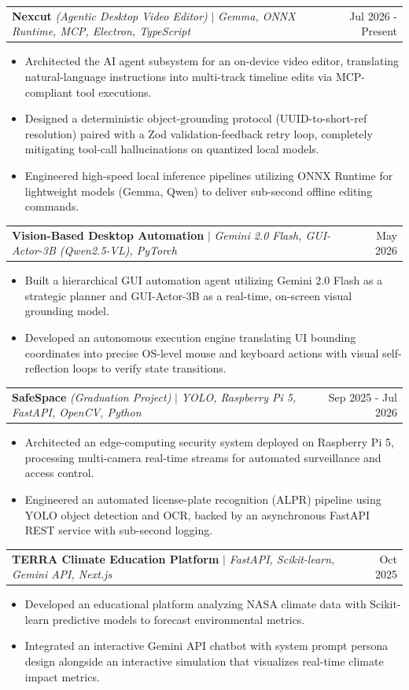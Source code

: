 \documentclass[letterpaper,11pt]{article}
\makeatletter
\newcommand{\resumeItem}[1]{
  \item\small{
    {#1 \vspace{-2.5pt}}
  }
}
\newcommand{\resumeProjectHeading}[2]{
    \item
    \begin{tabular*}{0.97\textwidth}{l@{\extracolsep{\fill}}r}
      \small#1 & #2 \\
    \end{tabular*}\vspace{-7pt}
}
\newcommand{\resumeItemListStart}{\begin{itemize}}
\newcommand{\resumeItemListEnd}{\end{itemize}\vspace{-5pt}}
\makeatother
\begin{document}
      \resumeProjectHeading
          {\textbf{Nexcut} \emph{(Agentic Desktop Video Editor)} $|$ \emph{Gemma, ONNX Runtime, MCP, Electron, TypeScript}}{Jul 2026 - Present}
          \resumeItemListStart
            \resumeItem{Architected the AI agent subsystem for an on-device video editor, translating natural-language instructions into multi-track timeline edits via MCP-compliant tool executions.}
            \resumeItem{Designed a deterministic object-grounding protocol (UUID-to-short-ref resolution) paired with a Zod validation-feedback retry loop, completely mitigating tool-call hallucinations on quantized local models.}
            \resumeItem{Engineered high-speed local inference pipelines utilizing ONNX Runtime for lightweight models (Gemma, Qwen) to deliver sub-second offline editing commands.}
          \resumeItemListEnd

      \resumeProjectHeading
          {\textbf{Vision-Based Desktop Automation} $|$ \emph{Gemini 2.0 Flash, GUI-Actor-3B (Qwen2.5-VL), PyTorch}}{May 2026}
          \resumeItemListStart
            \resumeItem{Built a hierarchical GUI automation agent utilizing Gemini 2.0 Flash as a strategic planner and GUI-Actor-3B as a real-time, on-screen visual grounding model.}
            \resumeItem{Developed an autonomous execution engine translating UI bounding coordinates into precise OS-level mouse and keyboard actions with visual self-reflection loops to verify state transitions.}
          \resumeItemListEnd

      \resumeProjectHeading
          {\textbf{SafeSpace} \emph{(Graduation Project)} $|$ \emph{YOLO, Raspberry Pi 5, FastAPI, OpenCV, Python}}{Sep 2025 - Jul 2026}
          \resumeItemListStart
            \resumeItem{Architected an edge-computing security system deployed on Raspberry Pi 5, processing multi-camera real-time streams for automated surveillance and access control.}
            \resumeItem{Engineered an automated license-plate recognition (ALPR) pipeline using YOLO object detection and OCR, backed by an asynchronous FastAPI REST service with sub-second logging.}
          \resumeItemListEnd

      \resumeProjectHeading
          {\textbf{TERRA Climate Education Platform} $|$ \emph{FastAPI, Scikit-learn, Gemini API, Next.js}}{Oct 2025}
          \resumeItemListStart
            \resumeItem{Developed an educational platform analyzing NASA climate data with Scikit-learn predictive models to forecast environmental metrics.}
            \resumeItem{Integrated an interactive Gemini API chatbot with system prompt persona design alongside an interactive simulation that visualizes real-time climate impact metrics.}
          \resumeItemListEnd
\end{document}
